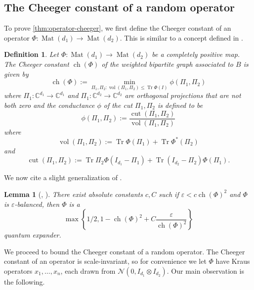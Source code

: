 \documentclass{article}
\newtheorem{lemma}[theorem]{Lemma}
\newtheorem{definition}{Definition}
\newcommand{\C}{{\mathbb{C}}}
\newcommand{\ot}{\otimes}
\newcommand{\mat}{\operatorname{Mat}}
\newcommand{\ch}{\operatorname{ch}}
\newcommand{\cut}{\operatorname{cut}}
\newcommand{\vol}{\operatorname{vol}}
\newcommand\eps{\varepsilon}
\newcommand\cN{\mathcal{N}}
\newcommand\samp{x}
\newcommand\tr{\operatorname{Tr}}
\begin{document}







\subsection{The Cheeger constant of a random operator}

To prove \cref{thm:operator-cheeger}, we first define the Cheeger constant of an operator $\Phi:\mat(d_1) \to \mat(d_2)$. This is similar to a concept defined in \cite{H07}.
\begin{definition}
Let $\Phi : \mat(d_1) \to \mat(d_2)$ be a completely positive map. The Cheeger constant $\ch(\Phi)$ of the weighted bipartite graph associated to $B$ is given by
$$\ch(\Phi):=\min_{\Pi_1, \Pi_2: \vol(\Pi_1, \Pi_2) \leq \tr \Phi(I)} \phi(\Pi_1,\Pi_2)$$
where $\Pi_1: \C^{d_1} \to \C^{d_1}$ and $\Pi_1: \C^{d_2} \to \C^{d_2}$ are orthogonal projections that are not both zero and the \emph{conductance} $\phi$ of the cut $\Pi_1, \Pi_2$ is defined to be
$$\phi(\Pi_1,\Pi_2) := \frac{\cut(\Pi_1, \Pi_2)}{\vol(\Pi_1,\Pi_2)}$$
where
$$ \vol(\Pi_1,\Pi_2):=
\tr \Phi(\Pi_1) + \tr \Phi^*(\Pi_2)$$
and $$ \cut(\Pi_1, \Pi_2):= \tr \Pi_2 \Phi(I_{d_1} - \Pi_1) + \tr (I_{d_2} - \Pi_2) \Phi(\Pi_1).$$
\end{definition}

We now cite a slight generalization of \cite{FM20}.

\begin{lemma} [\cite{FM20}, \cite{KLR19}]\label{lem:op-cheeger} There exist absolute constants $c, C$ such if $\eps < c \ch(\Phi)^2$ and $\Phi$ is $\eps$-balanced, then $\Phi$ is a
$$ \max\left\{1/2, 1 -  \ch(\Phi)^2 + C \frac{\eps}{\ch(\Phi)^2} \right\}$$
quantum expander.
\end{lemma}
We proceed to bound the Cheeger constant of a random operator. The Cheeger constant of an operator is scale-invariant, so for convenience we let $\Phi$ have Kraus operators $\samp_1, \dots, \samp_n$, each drawn from $\cN(0,  I_{d_1} \ot I_{d_2}).$ Our main observation is the following.
\end{document}
